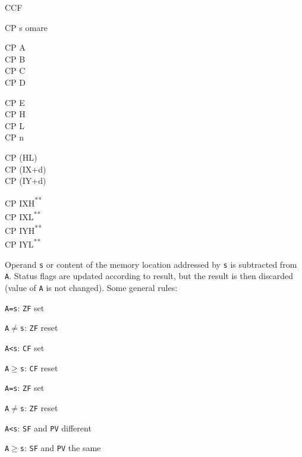 \documentclass[12pt,twoside,openright,a4paper]{book}
\newcommand{\UNDOC}{\textnormal{\textsuperscript{**}}}
\begin{document}
\begin{basedescript}{
	\desclabelstyle{\multilinelabel}
	\desclabelwidth{3cm}}
\begin{DetailItem}{CCF}
	\end{DetailItem}
	
	\pagebreak
	\label{DetailRefCP}
	\begin{DetailItem}{CP s}
		{omare}
		{}

		\begin{DetailVariants}[4]
			CP A\\
			CP B\\
			CP C\\
			CP D

			\columnbreak
			CP E\\
			CP H\\
			CP L\\
			CP n

			\columnbreak
			CP (HL)\\
			CP (IX+d)\\
			CP (IY+d)

			\columnbreak
			CP IXH\UNDOC\\
			CP IXL\UNDOC\\
			CP IYH\UNDOC\\
			CP IYL\UNDOC
		\end{DetailVariants}

		Operand {\tt s} or content of the memory location addressed by {\tt s} is subtracted from {\tt A}. Status flags are updated according to result, but the result is then discarded (value of {\tt A} is not changed). Some general rules:

		\begin{multicols}{2}
			\begin{DetailCompactList}[Signed]
				\item {\tt A=s}: {\tt ZF} set
				\item {\tt A$\neq$s}: {\tt ZF} reset
				\item {\tt A<s}: {\tt CF} set
				\item {\tt A$\geqslant$s}: {\tt CF} reset	
			\end{DetailCompactList}

			\columnbreak
			\begin{DetailCompactList}[Unsigned]
				\item {\tt A=s}: {\tt ZF} set
				\item {\tt A$\neq$s}: {\tt ZF} reset
				\item {\tt A<s}: {\tt SF} and {\tt PV} different
				\item {\tt A$\geqslant$s}: {\tt SF} and {\tt PV} the same				
			\end{DetailCompactList}
		\end{multicols}


\end{DetailItem}
\end{basedescript}
\end{document}
